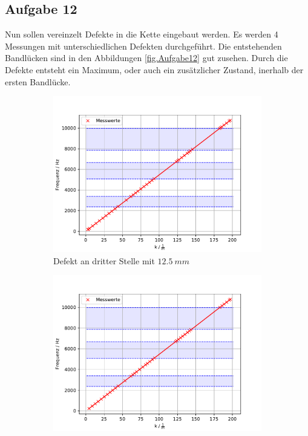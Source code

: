 \subsection{Aufgabe 12}
Nun sollen vereinzelt Defekte in die Kette eingebaut werden.
Es werden 4 Messungen mit unterschiedlichen Defekten durchgeführt.
Die entstehenden Bandlücken sind in den Abbildungen \ref{fig.Aufgabe12} gut zusehen.
Durch die Defekte entsteht ein Maximum, oder auch ein zusätzlicher Zustand, inerhalb der ersten Bandlücke.


  \begin{figure}
   \centering
   \begin{subfigure}{0.48\textwidth}
    \centering
    \includegraphics[width=1.1\textwidth]{max.pdf}
    \caption{Defekt an dritter Stelle mit $\SI{12.5}{mm}$}
    \label{fig.Aufgabe121}
   \end{subfigure}
   \begin{subfigure}{0.48\textwidth}
    \centering
    \includegraphics[width=1.1\textwidth]{max2.pdf}

\end{subfigure}
\end{figure}

